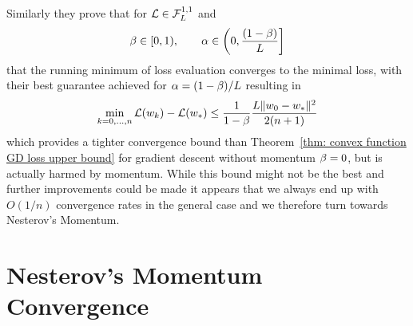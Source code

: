 Similarly they prove that for \(\mathcal{L}\in\mathcal{F}^{1,1}_{L}\) and
\begin{align*}
	\beta\in[0,1),
	\qquad \alpha\in \left(0, \frac{(1-\beta)}{L}\right]
\end{align*}
that the running minimum of loss evaluation converges to the minimal loss,
with their best guarantee achieved for \(\alpha =(1-\beta)/L\)
resulting in
\begin{align*}
	\min_{k=0,\dots,n}\mathcal{L}(w_k) -\mathcal{L}(w_*)
	\le \frac{1}{1-\beta}\frac{L\|w_0-w_*\|^2}{2(n+1)}
\end{align*}
which provides a tighter convergence bound than 
Theorem~\ref{thm: convex function GD loss upper bound} for gradient descent 
without momentum \(\beta=0\), but is actually harmed by momentum. While
this bound might not be the best and further improvements could be made
\parencite[see e.g.][]{sunNonErgodicConvergenceAnalysis2019} it appears that we
always end up with \(O(1/n)\) convergence rates in the general case and we
therefore turn towards Nesterov's Momentum.

\section{Nesterov's Momentum Convergence}\label{sec: nesterov momentum convergence}

